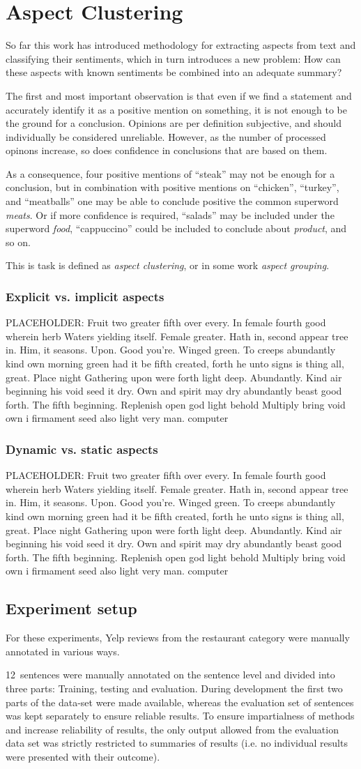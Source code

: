 \documentclass[a4paper,11pt]{kth-mag}
\newcommand{\category}{restaurant category }  %
\newcommand{\numAnnotated}{12}
\newif\ifhasStudiedFailures
\newcommand{\loremipsum}{
  {\color{lightgray}
  PLACEHOLDER: Fruit two greater fifth over every. In female fourth good wherein herb
  Waters yielding itself. Female greater. Hath in, second appear tree in.
  Him, it seasons. Upon. Good you're. Winged green. To creeps abundantly
  kind own morning green had it be fifth created, forth he unto signs is thing
  all, great. Place night Gathering upon were forth light deep. Abundantly.
  Kind air beginning his void seed it dry. Own and spirit may dry abundantly
  beast good forth. The fifth beginning. Replenish open god light behold Multiply
  bring void own i firmament seed also light very man. \gls{computer}

  }
}
\begin{document}
\chapter{Aspect Clustering}
So far this work has introduced methodology for extracting aspects from text and classifying their sentiments, which in turn introduces a new problem: How can these aspects with known sentiments be combined into an adequate summary?

The first and most important observation is that even if we find a statement and accurately identify it as a positive mention on something, it is not enough to be the ground for a conclusion. Opinions are per definition subjective, and should individually be considered unreliable. However, as the number of processed opinons increase, so does confidence in conclusions that are based on them.

As a consequence, four positive mentions of ``steak'' may not be enough for a conclusion, but in combination with positive mentions on ``chicken'', ``turkey'',  and ``meatballs'' one may be able to conclude positive the common \gls{superword} \emph{meats}. Or if more confidence is required, ``salads'' may be included under the \gls{superword} \emph{food}, ``cappuccino'' could be included to conclude about \emph{product}, and so on.

This is task is defined as \emph{aspect clustering}, or in some work \emph{aspect grouping}.

\subsection{Explicit vs. implicit aspects}
\loremipsum

\subsection{Dynamic vs. static aspects}
\loremipsum


\section{Experiment setup}
For these experiments, Yelp reviews from the \category were manually annotated in various ways.

\numAnnotated~sentences were manually annotated on the sentence level and divided into three parts: Training, testing and evaluation. During development the first two parts of the data-set were made available, whereas the evaluation set of sentences was kept separately to ensure reliable results. To ensure impartialness of methods and increase reliability of results, the only output allowed from the evaluation data set was strictly restricted to summaries of results (i.e. no individual results were presented with their outcome)\ifhasStudiedFailures, except for when failing instances were explicitly studied after method development was finished\fi.
\end{document}
